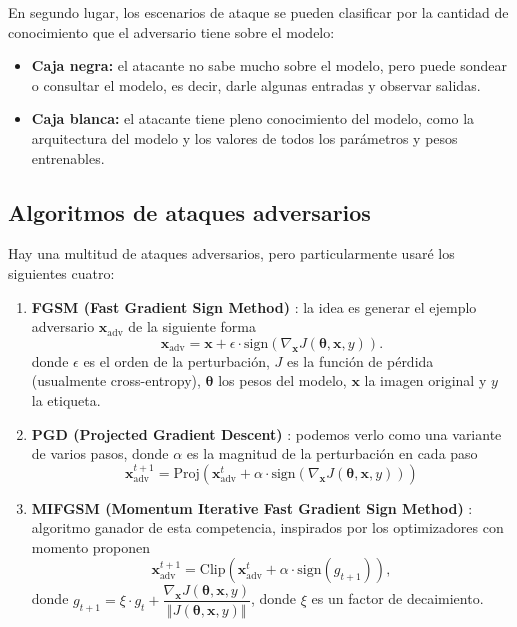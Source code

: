 \documentclass[10pt]{article}
\begin{document}
\begin{multicols*}{2}
En segundo lugar, los escenarios de ataque se pueden clasificar por la cantidad de conocimiento que el adversario tiene sobre el modelo:

\begin{itemize}
\item \textbf{Caja negra:} el atacante no sabe mucho sobre el modelo, pero puede sondear o consultar el modelo, es decir, darle algunas entradas y observar salidas.

\item \textbf{Caja blanca:} el atacante tiene pleno conocimiento del modelo, como la arquitectura del modelo y los valores de todos los parámetros y pesos entrenables.
\end{itemize}

\subsection{Algoritmos de ataques adversarios}

Hay una multitud de ataques adversarios, pero particularmente usaré los siguientes cuatro:

\begin{enumerate}
\item \textbf{FGSM (Fast Gradient Sign Method)} \cite{FGSM}: la idea es generar el ejemplo adversario $\bm{x}_{\text{adv}}$ de la siguiente forma
%
\[ \bm{x}_{\text{adv}} = \bm{x} + \epsilon \cdot \text{sign}\left( \nabla_{\bm{x}} J(\bm{\theta}, \bm{x}, y) \right). \]
%
donde $\epsilon$ es el orden de la perturbación, $J$ es la función de pérdida (usualmente cross-entropy), $\bm{\theta}$ los pesos del modelo, $\bm{x}$ la imagen original y $y$ la etiqueta.

\item \textbf{PGD (Projected Gradient Descent)} \cite{PGD}: podemos verlo como una variante de varios pasos, donde $\alpha$ es la magnitud de la perturbación en cada paso
%
\[ \bm{x}_{\text{adv}}^{t+1} = \text{Proj}\left( \bm{x}_{\text{adv}}^{t} + \alpha \cdot  \text{sign}\left( \nabla_{\bm{x}} J(\bm{\theta}, \bm{x}, y) \right) \right) \]

\item \textbf{MIFGSM (Momentum Iterative Fast Gradient Sign Method)} \cite{MIFGSM}: algoritmo ganador de esta competencia, inspirados por los optimizadores con momento proponen
%
\[ \bm{x}_{\text{adv}}^{t+1} = \text{Clip}\left( \bm{x}_{\text{adv}}^{t} + \alpha \cdot  \text{sign}(g_{t+1}) \right), \]
%
donde $g_{t+1} = \xi \cdot g_{t} + \dfrac{ \nabla_{\bm{x}} J(\bm{\theta}, \bm{x}, y)}{\left\Vert J(\bm{\theta}, \bm{x}, y) \right\Vert} $, donde $\xi$ es un factor de decaimiento.


\end{enumerate}
\end{multicols*}
\end{document}
